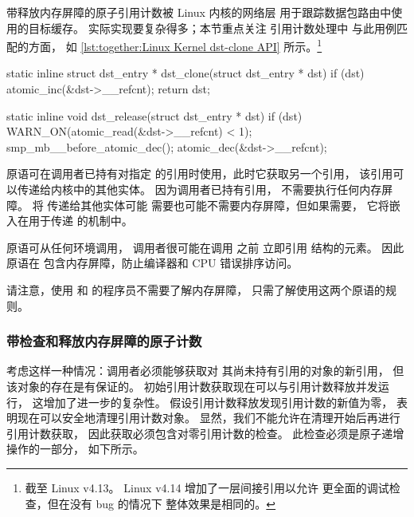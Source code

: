 带释放内存屏障的原子引用计数被 Linux 内核的网络层
用于跟踪数据包路由中使用的目标缓存。
实际实现要复杂得多；本节重点关注
 引用计数处理中
与此用例匹配的方面，
如 \cref{lst:together:Linux Kernel dst-clone API} 所示。\footnote{
	截至 Linux v4.13。
	Linux v4.14 增加了一层间接引用以允许
	更全面的调试检查，但在没有 bug 的情况下
	整体效果是相同的。}

\begin{listing}
\begin{fcvlabel}
\begin{VerbatimL}[commandchars=\\\[\]]
static inline
struct dst_entry * dst_clone(struct dst_entry * dst)
{
	if (dst)
		atomic_inc(&dst->__refcnt);
	return dst;
}

static inline
void dst_release(struct dst_entry * dst)
{
	if (dst) {
		WARN_ON(atomic_read(&dst->__refcnt) < 1);
		smp_mb__before_atomic_dec();		\lnlbl[mb]
		atomic_dec(&dst->__refcnt);
	}
}
\end{VerbatimL}
\end{fcvlabel}
\caption{Linux 内核  API}
\label{lst:together:Linux Kernel dst-clone API}
\end{listing}

 原语可在调用者已持有对指定 
的引用时使用，此时它获取另一个引用，
该引用可以传递给内核中的其他实体。
因为调用者已持有引用，
 不需要执行任何内存屏障。
将  传递给其他实体可能
需要也可能不需要内存屏障，但如果需要，
它将嵌入在用于传递  的机制中。

\begin{fcvref}
 原语可从任何环境调用，
调用者很可能在调用  之前
立即引用  结构的元素。
因此  原语在 
包含内存屏障，防止编译器和 CPU 错误排序访问。
\end{fcvref}

请注意，使用  和
 的程序员不需要了解内存屏障，
只需了解使用这两个原语的规则。

\subsubsection{带检查和释放内存屏障的原子计数}
\label{sec:together:Atomic Counting With Check and Release Memory Barrier}

考虑这样一种情况：调用者必须能够获取对
其尚未持有引用的对象的新引用，
但该对象的存在是有保证的。
初始引用计数获取现在可以与引用计数释放并发运行，
这增加了进一步的复杂性。
假设引用计数释放发现引用计数的新值为零，
表明现在可以安全地清理引用计数对象。
显然，我们不能允许在清理开始后再进行引用计数获取，
因此获取必须包含对零引用计数的检查。
此检查必须是原子递增操作的一部分，
如下所示。

